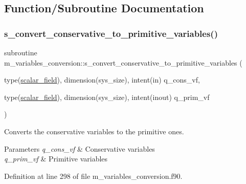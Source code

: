 \subsection{Function/\+Subroutine Documentation}
\mbox{\label{namespacem__variables__conversion_a589fffc2fe084855ea9e86935f1916b1}} 
\subsubsection{\texorpdfstring{s\+\_\+convert\+\_\+conservative\+\_\+to\+\_\+primitive\+\_\+variables()}{s\_convert\_conservative\_to\_primitive\_variables()}}
{\footnotesize\ttfamily subroutine m\+\_\+variables\+\_\+conversion\+::s\+\_\+convert\+\_\+conservative\+\_\+to\+\_\+primitive\+\_\+variables (\begin{DoxyParamCaption}\item[{type(\hyperlink{structm__derived__types_1_1scalar__field}{scalar\+\_\+field}), dimension(sys\+\_\+size), intent(in)}]{q\+\_\+cons\+\_\+vf,  }\item[{type(\hyperlink{structm__derived__types_1_1scalar__field}{scalar\+\_\+field}), dimension(sys\+\_\+size), intent(inout)}]{q\+\_\+prim\+\_\+vf }\end{DoxyParamCaption})}



Converts the conservative variables to the primitive ones. 


\begin{DoxyParams}{Parameters}
{\em q\+\_\+cons\+\_\+vf} & Conservative variables \\
\hline
{\em q\+\_\+prim\+\_\+vf} & Primitive variables \\
\hline
\end{DoxyParams}


Definition at line 298 of file m\+\_\+variables\+\_\+conversion.\+f90.

\mbox{\label{namespacem__variables__conversion_ab76f1517a0d2503be8e1bfa7a8825485}} 
